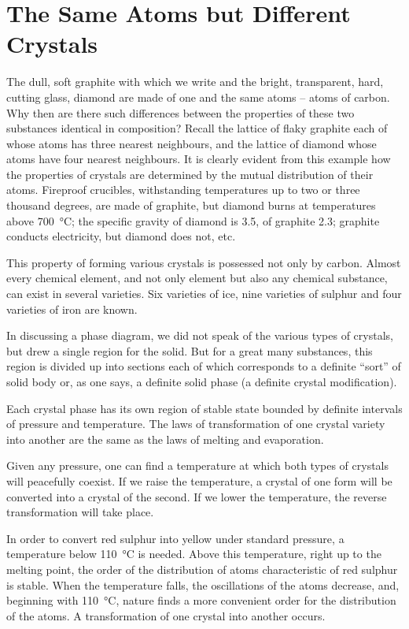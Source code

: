 \section{The Same Atoms but Different Crystals}

The dull, soft graphite with which we write and the bright, transparent, hard, cutting glass, diamond are made of one and the same atoms -- atoms of carbon. Why then are there such differences between the properties of these two substances identical in composition?
Recall the lattice of flaky graphite each of whose atoms has three nearest neighbours, and the lattice of diamond whose atoms have four nearest neighbours. It is clearly evident from this example how the properties of crystals are determined by the mutual distribution of their atoms. Fireproof crucibles, withstanding temperatures up to two or three thousand degrees, are made of graphite, but diamond burns at temperatures above \SI{700}{\celsius}; the spe­cific gravity of diamond is 3.5, of graphite 2.3; graphite conducts electricity, but diamond does not, etc.

This property of forming various crystals is possessed not only by carbon. Almost every chemical element, and not only element but also any chemical substance, can exist in several varieties. Six varieties of ice, nine varieties of sulphur and four varieties of iron are known.

In discussing a phase diagram, we did not speak of the various types of crystals, but drew a single region for the solid. But for a great many substances, this region is divided up into sections each of which corresponds to a definite ``sort'' of solid body or, as one says, a definite solid phase (a definite crystal modification).

Each crystal phase has its own region of stable state bounded by definite intervals of pressure and temperature. The laws of transformation of one crystal variety into another are the same as the laws of melting and evapora­tion.

Given any pressure, one can find a temperature at which both types of crystals will peacefully coexist. If we raise the temperature, a crystal of one form will be converted into a crystal of the second. If we lower the temperature, the reverse transformation will take place.

In order to convert red sulphur into yellow under stan­dard pressure, a temperature below \SI{110}{\celsius} is needed. Above this temperature, right up to the melting point, the order of the distribution of atoms characteristic of red sulphur is stable. When the temperature falls, the oscillations of the atoms decrease, and, beginning with \SI{110}{\celsius}, nature finds a more convenient order for the dis­tribution of the atoms. A transformation of one crystal into another occurs.

